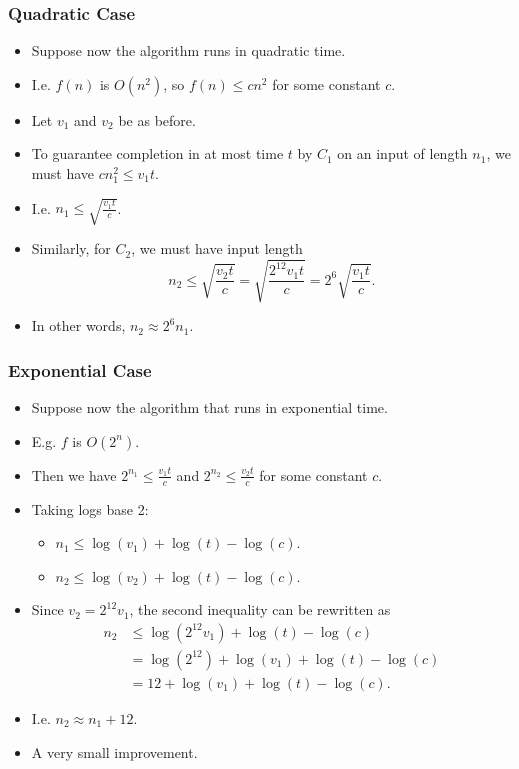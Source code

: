 \documentclass[handout]{beamer}
\begin{document}
\begin{frame}
\frametitle{Quadratic Case}
\begin{itemize}
\item Suppose now the algorithm runs in quadratic time.
\vspace{0.3cm}
\item I.e. $f(n)$ is $O(n^2)$, so $f(n)\leq cn^2$ for some constant $c$. 
\vspace{0.3cm}
\item Let $v_1$ and $v_2$ be as before. 
\vspace{0.3cm}
\item To guarantee completion in at most time $t$ by $C_1$ on an input of length $n_1$, we must have $cn_1^2\leq v_1t$. 
\vspace{0.3cm}
\item I.e. $n_1\leq \sqrt{\frac{v_1t}{c}}$.
\vspace{0.3cm} 
\item Similarly, for $C_2$, we must have input length \[n_2\leq \sqrt{\frac{v_2t}{c}}=\sqrt{\frac{2^{12}v_1t}{c}}= 2^6\sqrt{\frac{v_1t}{c}}.\]   
\item In other words, $n_2\approx 2^6n_1$.
\end{itemize}
\end{frame}

\begin{frame}
\frametitle{Exponential Case}
\begin{itemize}
\item Suppose now the algorithm that runs in exponential time.
\item  E.g. $f$ is $O(2^n)$. 
\item Then we have $2^{n_1}\leq \frac{v_1t}{c}$ and $2^{n_2}\leq \frac{v_2 t}{c}$ for some constant $c$. 
\item Taking logs base 2: 
\begin{itemize}
\item $n_1\leq \log(v_1) + \log(t) - \log (c)$. 
\item $n_2\leq \log(v_2) + \log(t) - \log (c)$.
\end{itemize}
\item Since $v_2=2^{12}v_1$, the second inequality can be rewritten as 
\begin{align*}n_2&\leq \log(2^{12}v_1) + \log(t) - \log (c)\\
&= \log(2^{12}) +\log(v_1) + \log(t) - \log (c)\\
&= 12 + \log(v_1) + \log(t) - \log (c).\end{align*}
\item I.e. $n_2\approx n_1 + 12$.
\item A very small improvement.
\end{itemize}
\end{frame}
\end{document}
